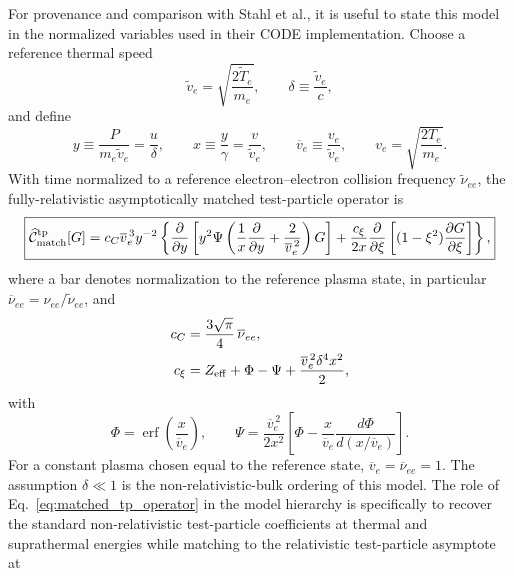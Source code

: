 \documentclass[11pt]{article}
\begin{document}
For provenance and comparison with Stahl et al., it is useful to state this model in
the normalized variables used in their CODE implementation.  Choose a reference thermal speed
\begin{equation}
 \widetilde v_e=\sqrt{\frac{2\widetilde T_e}{m_e}},\qquad
 \delta\equiv\frac{\widetilde v_e}{c},
\end{equation}
and define
\begin{equation}
 y\equiv\frac{P}{m_e\widetilde v_e}=\frac{u}{\delta},\qquad
 x\equiv\frac{y}{\gamma}=\frac{v}{\widetilde v_e},\qquad
 \overline v_e\equiv\frac{v_e}{\widetilde v_e},\qquad
 v_e=\sqrt{\frac{2T_e}{m_e}}.
 \label{eq:matched_variables}
\end{equation}
With time normalized to a reference electron--electron collision frequency
$\widetilde\nu_{ee}$, the fully-relativistic asymptotically matched test-particle operator is
\begin{equation}
 \boxed{
 \widehat{\mathcal C}_{\rm match}^{\rm tp}[G]
 =c_C\overline v_e^{\,3}y^{-2}
 \left\{
 \frac{\partial}{\partial y}
 \left[
  y^2\Psi
  \left(
   \frac{1}{x}\frac{\partial}{\partial y}
   +\frac{2}{\overline v_e^{\,2}}
  \right)G
 \right]
 +\frac{c_\xi}{2x}\frac{\partial}{\partial\xi}
 \left[(1-\xi^2)\frac{\partial G}{\partial\xi}\right]
 \right\},
 }
 \label{eq:matched_tp_operator}
\end{equation}
where a bar denotes normalization to the reference plasma state, in particular
$\overline\nu_{ee}=\nu_{ee}/\widetilde\nu_{ee}$, and
\begin{align}
 c_C&=\frac{3\sqrt{\pi}}{4}\,\overline\nu_{ee},\\
 c_\xi&=Z_{\rm eff}+\Phi-\Psi
       +\frac{\overline v_e^{\,2}\delta^4x^2}{2},
 \label{eq:matched_coefficients}
\end{align}
with
\begin{equation}
 \Phi=\operatorname{erf}\!\left(\frac{x}{\overline v_e}\right),\qquad
 \Psi=\frac{\overline v_e^{\,2}}{2x^2}
 \left[
  \Phi-\frac{x}{\overline v_e}
  \frac{d\Phi}{d(x/\overline v_e)}
 \right].
 \label{eq:matched_chandrasekhar}
\end{equation}
For a constant plasma chosen equal to the reference state,
$\overline v_e=\overline\nu_{ee}=1$.  The assumption $\delta\ll1$ is the
non-relativistic-bulk ordering of this model.  The role of
Eq.~\eqref{eq:matched_tp_operator} in the model hierarchy is specifically to
recover the standard non-relativistic test-particle coefficients at thermal and
suprathermal energies while matching to the relativistic test-particle asymptote at
\end{document}
